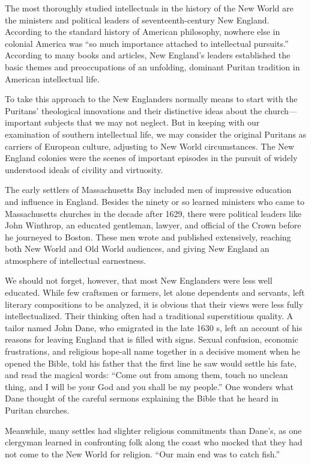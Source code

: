 The most thoroughly studied intellectuals in the history of the New
World are the ministers and political leaders of seventeenth-century New
England. According to the standard history of American philosophy,
nowhere else in colonial America was ``so much importance attached to
intellectual pursuits.'' According to many books and articles, New
England's leaders established the basic themes and preoccupations of an
unfolding, dominant Puritan tradition in American intellectual life.

To take this approach to the New Englanders normally means to start with
the Puritans' theological innovations and their distinctive ideas about
the church---important subjects that we may not neglect. But in keeping
with our examination of southern intellectual life, we may consider the
original Puritans as carriers of European culture, adjusting to New
World circumstances. The New England colonies were the scenes of
important episodes in the pursuit of widely understood ideals of
civility and virtuosity.

The early settlers of Massachusetts Bay included men of impressive
education and influence in England. Besides the ninety or so learned
ministers who came to Massachusetts churches in the decade after 1629,
there were political leaders like John Winthrop, an educated gentleman,
lawyer, and official of the Crown before he journeyed to Boston. These
men wrote and published extensively, reaching both New World and Old
World audiences, and giving New England an atmosphere of intellectual
earnestness.

We should not forget, however, that most New Englanders were less well
educated. While few craftsmen or farmers, let alone dependents and
servants, left literary compositions to be analyzed, it is obvious that their views were less fully intellectualized.
Their thinking often had a traditional superstitious quality. A tailor named John Dane,
who emigrated in the late 1630 s, left an account of his reasons for
leaving England that is filled with signs. Sexual confusion, economic
frustrations, and religious hope-all name together in a decisive moment
when he opened the Bible, told his father that the first line he saw
would settle his fate, and read the magical words: ``Come out from among
them, touch no unclean thing, and I will be your God and you shall be my
people.'' One wonders what Dane thought of the careful sermons
explaining the Bible that he heard in Puritan churches.

Meanwhile, many settles had slighter religious commitments than Dane's,
as one clergyman learned in confronting folk along the coast who mocked
that they had not come to the New World for religion. ``Our main end was
to catch fish.''



